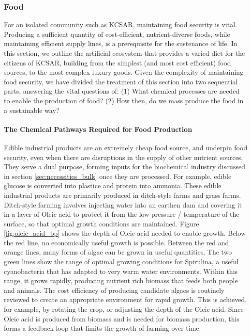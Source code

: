\documentclass[fleqn,10pt]{Stylesheet} %
\begin{document}
\subsubsection{Food}
\label{sec:necessities_food}
 
For an isolated community such as KCSAR, maintaining food security is vital. Producing a sufficient quantity of cost-efficient, nutrient-diverse foods, while maintaining efficient supply lines, is a prerequisite for the sustenance of life. In this section, we outline the artificial ecosystem that provides a varied diet for the citizens of KCSAR, building from the simplest (and most cost efficient) food sources, to the most complex luxury goods. Given the complexity of maintaining food security, we have divided the treatment of this section into two sequential parts, answering the vital questions of: (1) What chemical processes are needed to enable the production of food? (2) How then, do we mass produce the food in a sustainable way?

\paragraph{The Chemical Pathways Required for Food Production}

Edible industrial products are an extremely cheap food source, and underpin food security, even when there are disruptions in the supply of other nutrient sources. They serve a dual purpose, forming inputs for the biochemical industry discussed in section \ref{sec:necessities_bulk} once they are processed. For example, edible glucose is converted into plastice and protein into ammonia. These edible industrial products are primarily produced in ditch-style farms and grass farms. Ditch-style farming involves injecting water into an earthen dam and covering it in a layer of Oleic acid to protect it from the low pressure / temperature of the surface, so that optimal growth conditions are maintained. Figure \ref{fig:oleic_acid_bp} shows the depth of Oleic acid needed to enable growth. Below the red line, no economically useful growth is possible. Between the red and orange lines, many forms of algae can be grown in useful quantities. The two green lines show the range of optimal growing conditions for Spirulina, a useful cyanobacteria that has adapted to very warm water environments. Within this range, it grows rapidly, producing nutrient rich biomass that feeds both people and animals. The cost efficiency of producing candidate algaes is routinely reviewed to create an appropriate environment for rapid growth. This is achieved, for example, by rotating the crop, or adjusting the depth of the Oleic acid. Since Oleic acid is produced from biomass and is needed for biomass production, this forms a feedback loop that limits the growth of farming over time.
\end{document}
